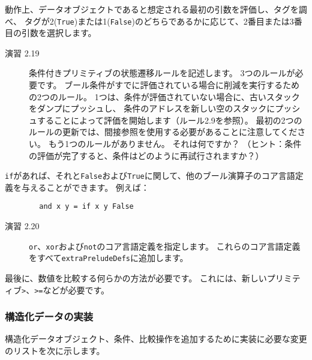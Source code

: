 \documentclass{jarticle}
\begin{document}
動作上、データオブジェクトであると想定される最初の引数を評価し、タグを調べ、
タグが2(\texttt{True})または1(\texttt{False})のどちらであるかに応じて、2番目または3番目の引数を選択します。

\begin{description}
	\item[演習 2.19] 条件付きプリミティブの状態遷移ルールを記述します。
	      3つのルールが必要です。
	      ブール条件がすでに評価されている場合に削減を実行するための2つのルール。
	      1つは、条件が評価されていない場合に、古いスタックをダンプにプッシュし、
	      条件のアドレスを新しい空のスタックにプッシュすることによって評価を開始します（ルール2.9を参照）。
	      最初の2つのルールの更新では、間接参照を使用する必要があることに注意してください。
	      もう1つのルールがありません。
	      それは何ですか？
	      （ヒント：条件の評価が完了すると、条件はどのように再試行されますか？）
\end{description}

\texttt{if}があれば、それと\texttt{False}および\texttt{True}に関して、他のブール演算子のコア言語定義を与えることができます。
例えば：

\begin{verbatim}
        and x y = if x y False
\end{verbatim}

\begin{description}
	\item[演習 2.20] \texttt{or}、\texttt{xor}および\texttt{not}のコア言語定義を指定します。
	      これらのコア言語定義をすべて\texttt{extraPreludeDefs}に追加します。
\end{description}

最後に、数値を比較する何らかの方法が必要です。
これには、新しいプリミティブ\texttt{>}、\texttt{>=}などが必要です。

\subsubsection{構造化データの実装}

構造化データオブジェクト、条件、比較操作を追加するために実装に必要な変更のリストを次に示します。
\end{document}
